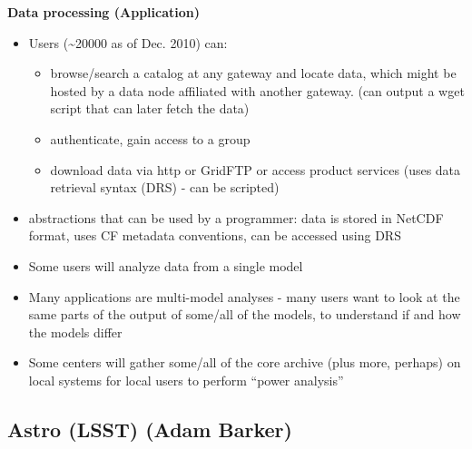 \documentclass[preprint,12pt]{article}
\begin{document}
{\bf Data processing (Application)}

\begin{itemize}
    \item  Users (\~{}20000 as of Dec. 2010) can:
\begin{itemize}
         \item  browse/search a catalog at any gateway and locate data, which might be hosted by a data node affiliated with another gateway. (can output a wget script that can later fetch the data)
         \item  authenticate, gain access to a group
        \item  download data via http or GridFTP or access product services (uses data retrieval syntax (DRS) - can be scripted)
  \end{itemize}
\end{itemize}

\begin{itemize}
    \item  abstractions that can be used by a programmer: data is stored in NetCDF format, uses CF metadata conventions, can be accessed using DRS
    \item  Some users will analyze data from a single model
    \item  Many applications are multi-model analyses - many users want to look at the same parts of the output of some/all of the models, to understand if and how the models differ
    \item  Some centers will gather some/all of the core archive (plus more, perhaps) on local systems for local users to perform ``power analysis''
\end{itemize}



\subsection{Astro (LSST) (Adam Barker) \label{astroAdam}}
\end{document}
